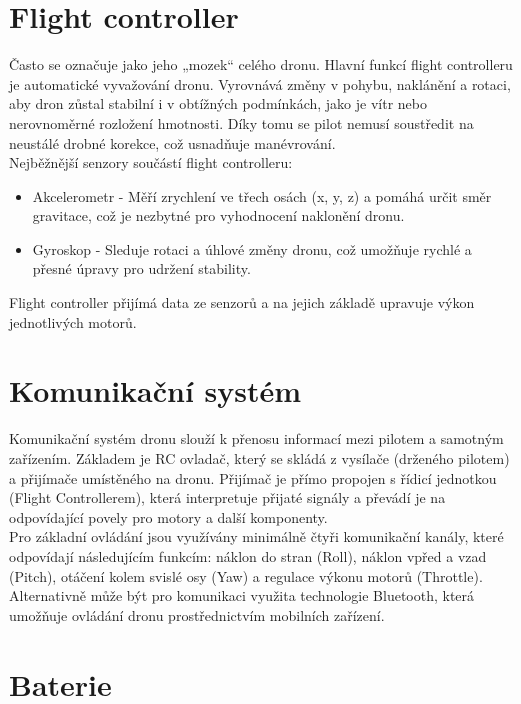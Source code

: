 \documentclass[12pt]{report}
\begin{document}
\section{Flight controller}

Často se označuje jako jeho „mozek“ celého dronu. Hlavní funkcí flight controlleru je automatické vyvažování dronu. Vyrovnává změny v pohybu, naklánění a rotaci, aby dron zůstal stabilní i v obtížných podmínkách, jako je vítr nebo nerovnoměrné rozložení hmotnosti. Díky tomu se pilot nemusí soustředit na neustálé drobné korekce, což usnadňuje manévrování.\\

Nejběžnější senzory součástí flight controlleru:
\begin{itemize}
	\item Akcelerometr -  Měří zrychlení ve třech osách (x, y, z) a pomáhá určit směr gravitace, což je nezbytné pro vyhodnocení naklonění dronu.
	\item Gyroskop - Sleduje rotaci a úhlové změny dronu, což umožňuje rychlé a přesné úpravy pro udržení stability.
\end{itemize}

Flight controller přijímá data ze senzorů a na jejich základě upravuje výkon jednotlivých motorů. \cite{mainbook}

\section{Komunikační systém}
Komunikační systém dronu slouží k přenosu informací mezi pilotem a samotným zařízením. Základem je RC ovladač, který se skládá z vysílače (drženého pilotem) a přijímače umístěného na dronu. Přijímač je přímo propojen s řídicí jednotkou (Flight Controllerem), která interpretuje přijaté signály a převádí je na odpovídající povely pro motory a další komponenty.\\
Pro základní ovládání jsou využívány minimálně čtyři komunikační kanály, které odpovídají následujícím funkcím: náklon do stran (Roll), náklon vpřed a vzad (Pitch), otáčení kolem svislé osy (Yaw) a regulace výkonu motorů (Throttle). Alternativně může být pro komunikaci využita technologie Bluetooth, která umožňuje ovládání dronu prostřednictvím mobilních zařízení.

\section{Baterie}
\end{document}
